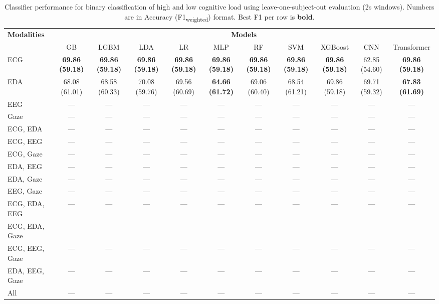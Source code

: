 \begin{table}[!htbp]
  \centering
  \scriptsize
  \setlength{\tabcolsep}{3pt}
  \caption{Classifier performance for binary classification of high and low cognitive load using leave-one-subject-out evaluation (2s windows). Numbers are in Accuracy (F1\textsubscript{weighted}) format. Best F1 per row is \textbf{bold}.}
  \label{tab:results_loso_2s}
  \begin{tabular}{lcccccccccc}
    \toprule
    \textbf{Modalities} & \multicolumn{10}{c}{\textbf{Models}} \\
    \cmidrule(l){2-11}
    & GB & LGBM & LDA & LR & MLP & RF & SVM & XGBoost & CNN & Transformer \\
    \midrule
    ECG & \textbf{69.86 (59.18)} & \textbf{69.86 (59.18)} & \textbf{69.86 (59.18)} & \textbf{69.86 (59.18)} & \textbf{69.86 (59.18)} & \textbf{69.86 (59.18)} & \textbf{69.86 (59.18)} & \textbf{69.86 (59.18)} & 62.85 (54.60) & \textbf{69.86 (59.18)} \\
    EDA & 68.08 (61.01) & 68.58 (60.33) & 70.08 (59.76) & 69.56 (60.69) & \textbf{64.66 (61.72)} & 69.06 (60.40) & 68.54 (61.21) & 69.86 (59.18) & 69.71 (59.32) & \textbf{67.83 (61.69)} \\
    EEG & — & — & — & — & — & — & — & — & — & — \\
    Gaze & — & — & — & — & — & — & — & — & — & — \\
    \midrule
    ECG, EDA & — & — & — & — & — & — & — & — & — & — \\
    ECG, EEG & — & — & — & — & — & — & — & — & — & — \\
    ECG, Gaze & — & — & — & — & — & — & — & — & — & — \\
    EDA, EEG & — & — & — & — & — & — & — & — & — & — \\
    EDA, Gaze & — & — & — & — & — & — & — & — & — & — \\
    EEG, Gaze & — & — & — & — & — & — & — & — & — & — \\
    \midrule
    ECG, EDA, EEG & — & — & — & — & — & — & — & — & — & — \\
    ECG, EDA, Gaze & — & — & — & — & — & — & — & — & — & — \\
    ECG, EEG, Gaze & — & — & — & — & — & — & — & — & — & — \\
    EDA, EEG, Gaze & — & — & — & — & — & — & — & — & — & — \\
    \midrule
    All & — & — & — & — & — & — & — & — & — & — \\
    \bottomrule
  \end{tabular}
\end{table}

